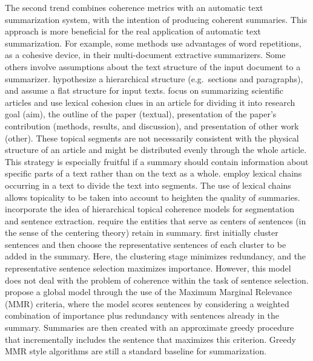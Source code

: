 The second trend combines coherence metrics with an automatic text summarization system, with the intention of producing coherent summaries.  
This approach is more beneficial for the real application of automatic text summarization. 
For example, some methods \cite{radev04a,nenkova05} use advantages of word repetitions, as a cohesive device, in their \mbox{multi-document} extractive summarizers. 
Some others involve assumptions about the text structure of the input document to a summarizer. 
 hypothesize a hierarchical structure (e.g.\ sections and paragraphs), and  assume a flat structure for input texts. 
 focus on summarizing scientific articles and use lexical cohesion clues in an article for dividing it into research goal (aim), the outline of the paper (textual), presentation of the paper's contribution (methods, results, and discussion), and presentation of other work (other). 
These topical segments are not necessarily consistent with the physical structure of an article and might be distributed evenly through the whole article. 
This strategy is especially fruitful if a summary should contain information about specific parts of a text rather than on the text as a whole.  
 employ lexical chains occurring in a text to divide the text into segments.  
The use of lexical chains allows topicality to be taken into account to heighten the quality of summaries.
 incorporate the idea of hierarchical topical coherence models for segmentation and sentence extraction. 
 require the entities that serve as centers of sentences (in the sense of the centering theory) retain in summary. 
 first initially cluster sentences and then choose the representative sentences of each cluster to be added in the summary. 
Here, the clustering stage minimizes redundancy, and the representative sentence selection maximizes importance.
However, this model does not deal with the problem of coherence within the task of sentence selection. 
 propose a global model through the use of the Maximum Marginal Relevance (MMR) criteria, where the model scores sentences by considering a weighted combination of importance plus redundancy with sentences already in the summary. 
Summaries are then created with an approximate greedy procedure that incrementally includes the sentence that maximizes this criterion.  
Greedy MMR style algorithms are still a standard baseline for summarization. 


